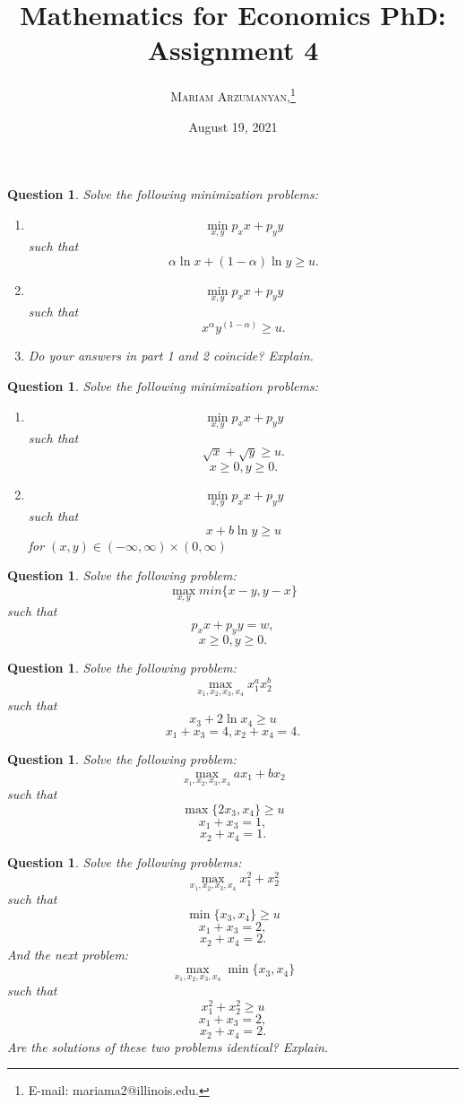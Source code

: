 \documentclass[12pt]{article}
\newtheorem{ques}[theorem]{Question}
\begin{document}
\setcounter{footnote}{0}
\title{Mathematics for Economics PhD: Assignment 4}
\author{\textsc{Mariam Arzumanyan,}\thanks {   E-mail: mariama2@illinois.edu.} \\ } 


\date{August 19, 2021}


\maketitle 

\begin{ques}
Solve the following minimization problems:
\begin{enumerate}
    \item \[\min_{x,y} p_xx+p_yy\]
    such that \[\alpha\ln x+(1-\alpha)\ln y\geq u.
    \]
    \item \[\min_{x,y} p_xx+p_yy\]
    such that \[ x^\alpha y^{(1-\alpha)}\geq u.
    \]
    \item Do your answers in part 1 and 2 coincide? Explain.
\end{enumerate}
\end{ques}

\newpage
\begin{ques}
Solve the following minimization problems:
\begin{enumerate}
    \item \[\min_{x,y} p_xx+p_yy\]
    such that \[\sqrt{x}+\sqrt{y}\geq u.
    \]
    \[x\geq 0, y\geq 0.
    \]
    \item \[\min_{x,y} p_xx+p_yy\]
    such that \[ x+b\ln y \geq u\]
    for $(x,y)\in (-\infty, \infty)\times(0, \infty)$
\end{enumerate}
\end{ques}


\newpage
\begin{ques}
Solve the following problem:
\[\max_{x,y} min\{x-y, y-x\}
\]
such that \[p_xx+p_yy=w,
\]\[x\geq 0, y\geq 0.
    \]
\end{ques}

\newpage
\begin{ques}
Solve the following problem:
\[\max_{x_1,x_2, x_3, x_4} x_1^a x_2^b
\]
such that \[x_3+2\ln x_4\geq u
\]\[x_1+x_3=4, x_2+x_4=4.
    \]
\end{ques}

\newpage
\begin{ques}
Solve the following problem:
\[\max_{x_1,x_2, x_3, x_4} ax_1+ bx_2
\]
such that \[\max \{ 2x_3, x_4\}\geq u
\]\[x_1+x_3=1,\]
\[x_2+x_4=1.
    \]
\end{ques}
\newpage
\begin{ques}
Solve the following problems:
\[\max_{x_1,x_2, x_3, x_4} x_1^2+ x_2^2
\]
such that \[\min \{ x_3, x_4\}\geq u
\]\[x_1+x_3=2,\]
\[x_2+x_4=2.
    \]
And the next problem:
\[\max_{x_1,x_2, x_3, x_4} \min \{ x_3, x_4\}
\]
such that \[x_1^2+ x_2^2\geq u
\]\[x_1+x_3=2,\]
\[x_2+x_4=2.
    \]
    Are the solutions of these two problems identical? Explain.
\end{ques}
\end{document}
